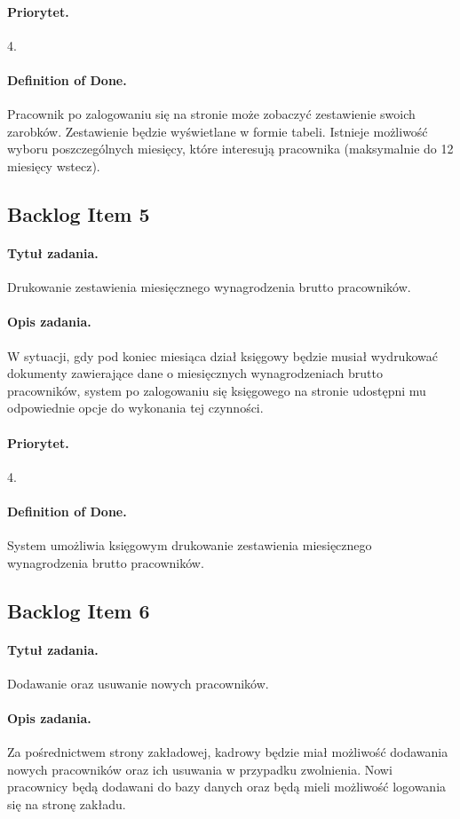 \documentclass[a4paper]{article}
\begin{document}
\paragraph{Priorytet.} 4.
\paragraph{Definition of Done.} Pracownik po zalogowaniu się na stronie może zobaczyć zestawienie swoich zarobków. Zestawienie będzie wyświetlane w formie tabeli. Istnieje możliwość wyboru poszczególnych miesięcy, które interesują pracownika (maksymalnie do 12 miesięcy wstecz).

\subsection{Backlog Item 5}
\paragraph{Tytuł zadania.} Drukowanie zestawienia miesięcznego wynagrodzenia brutto pracowników.
\paragraph{Opis zadania.} W sytuacji, gdy pod koniec miesiąca dział księgowy będzie musiał wydrukować dokumenty zawierające dane o miesięcznych wynagrodzeniach brutto pracowników, system po zalogowaniu się księgowego na stronie udostępni mu odpowiednie opcje do wykonania tej czynności.
\paragraph{Priorytet.} 4.
\paragraph{Definition of Done.} System umożliwia księgowym drukowanie zestawienia miesięcznego wynagrodzenia brutto pracowników.

\subsection{Backlog Item 6}
\paragraph{Tytuł zadania.} Dodawanie oraz usuwanie nowych pracowników.
\paragraph{Opis zadania.} Za pośrednictwem strony zakładowej, kadrowy będzie miał możliwość dodawania nowych pracowników oraz ich usuwania w przypadku zwolnienia. Nowi pracownicy będą dodawani do bazy danych oraz będą mieli możliwość logowania się na stronę zakładu.
\end{document}
